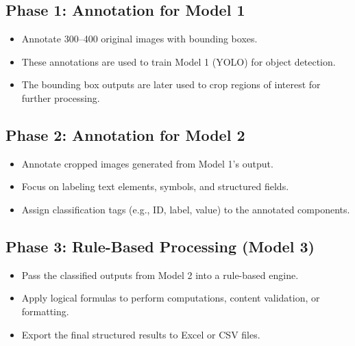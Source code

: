 \documentclass{article}
\begin{document}
\subsection*{Phase 1: Annotation for Model 1}
\begin{itemize}
    \item Annotate 300--400 original images with bounding boxes.
    \item These annotations are used to train Model 1 (YOLO) for object detection.
    \item The bounding box outputs are later used to crop regions of interest for further processing.
\end{itemize}

\subsection*{Phase 2: Annotation for Model 2}
\begin{itemize}
    \item Annotate cropped images generated from Model 1’s output.
    \item Focus on labeling text elements, symbols, and structured fields.
    \item Assign classification tags (e.g., ID, label, value) to the annotated components.
\end{itemize}

\subsection*{Phase 3: Rule-Based Processing (Model 3)}
\begin{itemize}
    \item Pass the classified outputs from Model 2 into a rule-based engine.
    \item Apply logical formulas to perform computations, content validation, or formatting.
    \item Export the final structured results to Excel or CSV files.
\end{itemize}
\end{document}
